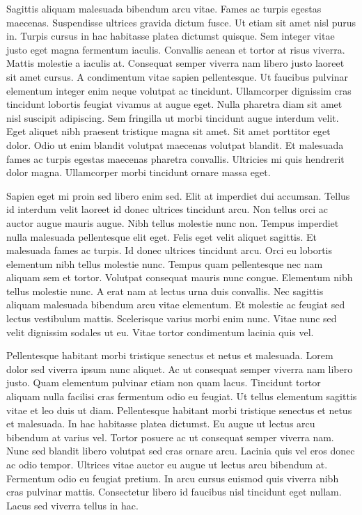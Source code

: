 \documentclass[11pt,a4paper]{article}
\begin{document}
Sagittis aliquam malesuada bibendum arcu vitae. Fames ac turpis egestas maecenas. Suspendisse ultrices gravida dictum fusce. Ut etiam sit amet nisl purus in. Turpis cursus in hac habitasse platea dictumst quisque. Sem integer vitae justo eget magna fermentum iaculis. Convallis aenean et tortor at risus viverra. Mattis molestie a iaculis at. Consequat semper viverra nam libero justo laoreet sit amet cursus. A condimentum vitae sapien pellentesque. Ut faucibus pulvinar elementum integer enim neque volutpat ac tincidunt. Ullamcorper dignissim cras tincidunt lobortis feugiat vivamus at augue eget. Nulla pharetra diam sit amet nisl suscipit adipiscing. Sem fringilla ut morbi tincidunt augue interdum velit. Eget aliquet nibh praesent tristique magna sit amet. Sit amet porttitor eget dolor. Odio ut enim blandit volutpat maecenas volutpat blandit. Et malesuada fames ac turpis egestas maecenas pharetra convallis. Ultricies mi quis hendrerit dolor magna. Ullamcorper morbi tincidunt ornare massa eget.

Sapien eget mi proin sed libero enim sed. Elit at imperdiet dui accumsan. Tellus id interdum velit laoreet id donec ultrices tincidunt arcu. Non tellus orci ac auctor augue mauris augue. Nibh tellus molestie nunc non. Tempus imperdiet nulla malesuada pellentesque elit eget. Felis eget velit aliquet sagittis. Et malesuada fames ac turpis. Id donec ultrices tincidunt arcu. Orci eu lobortis elementum nibh tellus molestie nunc. Tempus quam pellentesque nec nam aliquam sem et tortor. Volutpat consequat mauris nunc congue. Elementum nibh tellus molestie nunc. A erat nam at lectus urna duis convallis. Nec sagittis aliquam malesuada bibendum arcu vitae elementum. Et molestie ac feugiat sed lectus vestibulum mattis. Scelerisque varius morbi enim nunc. Vitae nunc sed velit dignissim sodales ut eu. Vitae tortor condimentum lacinia quis vel.

Pellentesque habitant morbi tristique senectus et netus et malesuada. Lorem dolor sed viverra ipsum nunc aliquet. Ac ut consequat semper viverra nam libero justo. Quam elementum pulvinar etiam non quam lacus. Tincidunt tortor aliquam nulla facilisi cras fermentum odio eu feugiat. Ut tellus elementum sagittis vitae et leo duis ut diam. Pellentesque habitant morbi tristique senectus et netus et malesuada. In hac habitasse platea dictumst. Eu augue ut lectus arcu bibendum at varius vel. Tortor posuere ac ut consequat semper viverra nam. Nunc sed blandit libero volutpat sed cras ornare arcu. Lacinia quis vel eros donec ac odio tempor. Ultrices vitae auctor eu augue ut lectus arcu bibendum at. Fermentum odio eu feugiat pretium. In arcu cursus euismod quis viverra nibh cras pulvinar mattis. Consectetur libero id faucibus nisl tincidunt eget nullam. Lacus sed viverra tellus in hac.
\end{document}
